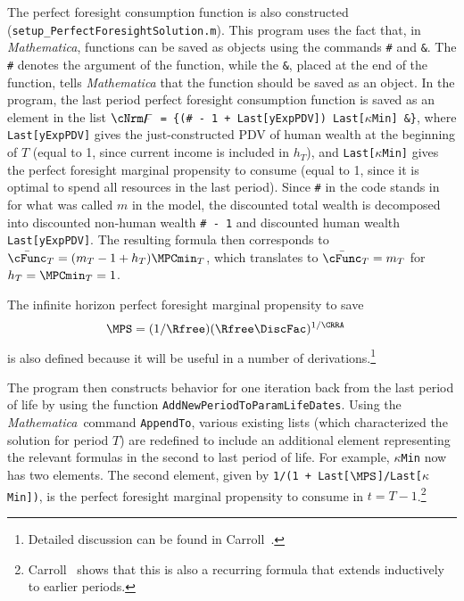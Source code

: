 \documentclass[titlepage, headings=optiontotocandhead]{\econtex}
\newcommand{\Mma}{\textit{Mathematica}}
\begin{document}
The perfect foresight consumption function is also constructed
(\texttt{setup\_PerfectForesightSolution.m}).  This program uses the
fact that, in {\Mma}, functions can be saved as objects using the
commands \texttt{\#} and \texttt{\&}. The \texttt{\#} denotes the
argument of the function, while the \texttt{\&}, placed at the end of
the function, tells {\Mma} that the function should be saved as an
object. In the program, the last period perfect foresight consumption
function is saved as an element in the list \texttt{$\cNrm\digamma$ =
  \{(\# - 1 + Last[yExpPDV]) Last[$\kappa$Min] \&\}}, where
\texttt{Last[yExpPDV]} gives the just-constructed PDV of human wealth
at the beginning of $T$ (equal to 1, since current income is included
in $h_{T}$), and \texttt{Last[$\kappa$Min]} gives the perfect
foresight marginal propensity to consume (equal to 1, since it is
optimal to spend all resources in the last period). Since \texttt{\#}
in the code stands in for what was called $m$ in the model, the
discounted total wealth is decomposed into discounted non-human wealth
\texttt{\# - 1} and discounted human wealth
\texttt{Last[yExpPDV]}. The resulting formula then corresponds to
$\bar{\cFunc}_{T} = (m_{T}-1+{h}_{T})\MPCmin_{T}$, which translates to
$\bar{\cFunc}_{T} = m_{T}$ for ${h}_{T}=\MPCmin_{T}=1$.

The infinite horizon perfect foresight marginal propensity to save 
\begin{equation}\begin{gathered}\begin{aligned}
      \MPS  & = (1/\Rfree)(\Rfree \DiscFac)^{1/\CRRA} \label{eq:lambdadefn}
    \end{aligned}\end{gathered}\end{equation}
is also defined because it will be useful in a number of derivations.\footnote{Detailed discussion can
  be found in Carroll~\citeyearpar{BufferStockTheory}.}

The program then constructs behavior for one iteration back from the
last period of life by using the function
\texttt{AddNewPeriodToParamLifeDates}.  Using the {\Mma}~command
\texttt{AppendTo}, various existing lists (which characterized the
solution for period $T$) are redefined to include an additional
element representing the relevant formulas in the second to last
period of life. For example, \texttt{$\kappa$Min} now has two
elements.  The second element, given by \texttt{1/(1 +
  Last[$\MPS$]/Last[$\kappa$Min])}, is the perfect foresight marginal
propensity to consume in $t=T-1$.\footnote{Carroll~\citeyearpar{BufferStockTheory} shows that this is also a
  recurring formula that extends inductively to earlier periods.}
\end{document}
